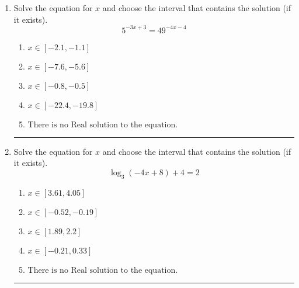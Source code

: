 \documentclass[14pt]{extbook}
\newcommand{\litem}[1]{\item#1\hspace*{-1cm}\rule{\textwidth}{0.4pt}}
\begin{document}
\begin{enumerate}
{\begin{enumerate}[label=\Alph*.]
\end{enumerate} }
\litem{
Solve the equation for $x$ and choose the interval that contains the solution (if it exists).\[ 5^{-3x+3} = 49^{-4x-4} \]\begin{enumerate}[label=\Alph*.]
\item \( x \in [-2.1, -1.1] \)
\item \( x \in [-7.6, -5.6] \)
\item \( x \in [-0.8, -0.5] \)
\item \( x \in [-22.4, -19.8] \)
\item \( \text{There is no Real solution to the equation.} \)

\end{enumerate} }
\litem{
Solve the equation for $x$ and choose the interval that contains the solution (if it exists).\[ \log_{3}{(-4x+8)}+4 = 2 \]\begin{enumerate}[label=\Alph*.]
\item \( x \in [3.61, 4.05] \)
\item \( x \in [-0.52, -0.19] \)
\item \( x \in [1.89, 2.2] \)
\item \( x \in [-0.21, 0.33] \)
\item \( \text{There is no Real solution to the equation.} \)

\end{enumerate} }
\end{enumerate}
\end{document}
